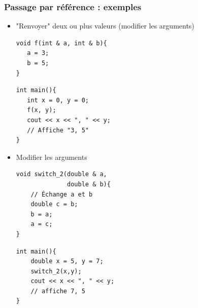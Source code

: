 \begin{frame}[fragile]
	\frametitle{Passage par référence : exemples}
	\begin{itemize}
	\item "Renvoyer" deux ou plus valeurs (modifier les arguments)
	\begin{minipage}{0.49\linewidth}
		\begin{verbatim}
void f(int & a, int & b){
   a = 3;
   b = 5;
}
		\end{verbatim}
	\end{minipage}
	\hfill
	\begin{minipage}{0.47\linewidth}
		\begin{verbatim}
int main(){
   int x = 0, y = 0;
   f(x, y);
   cout << x << ", " << y;
   // Affiche "3, 5"
}
		\end{verbatim}
	\end{minipage}
	\item Modifier les arguments

	\begin{minipage}{0.49\linewidth}
			\begin{verbatim}
void switch_2(double & a,
              double & b){
    // Échange a et b
    double c = b;
    b = a;
    a = c;
}
			\end{verbatim}
		\end{minipage}
		\hfill
		\begin{minipage}{0.47\linewidth}
			\begin{verbatim}
int main(){
    double x = 5, y = 7;
    switch_2(x,y);
    cout << x << ", " << y;
    // affiche 7, 5
}
			\end{verbatim}
		\end{minipage}
	\end{itemize}
\end{frame}

